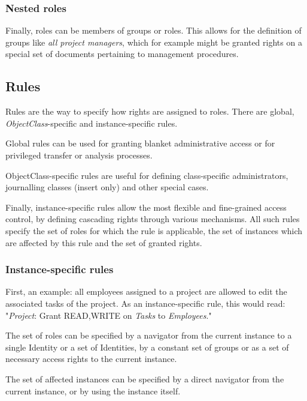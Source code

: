 \subsubsection{Nested roles}

Finally, roles can be members of groups or roles. This allows for the definition
of groups like \emph{all project managers}, which for example might be granted
rights on a special set of documents pertaining to management procedures.

\subsection{Rules}

Rules are the way to specify how rights are assigned to roles. There are global,
\emph{ObjectClass}-specific and instance-specific rules. 

Global rules can be used for granting blanket administrative access or for
privileged transfer or analysis processes.

ObjectClass-specific rules are useful for defining class-specific
administrators, journalling classes (insert only) and other special cases.

Finally, instance-specific rules allow the most flexible and fine-grained access
control, by defining cascading rights through various mechanisms. All such rules
specify the set of roles for which the rule is applicable, the set of instances
which are affected by this rule and the set of granted rights.

\subsubsection{Instance-specific rules}

First, an example: all employees assigned to a project are allowed to edit the
associated tasks of the project. As an instance-specific rule, this would read:
"\emph{Project}: Grant READ,WRITE on \emph{Tasks} to \emph{Employees}."

The set of roles can be specified by a navigator from the current instance to a
single Identity or a set of Identities, by a constant set of groups or as a set
of necessary access rights to the current instance.

The set of affected instances can be specified by a direct navigator from the
current instance, or by using the instance itself.


